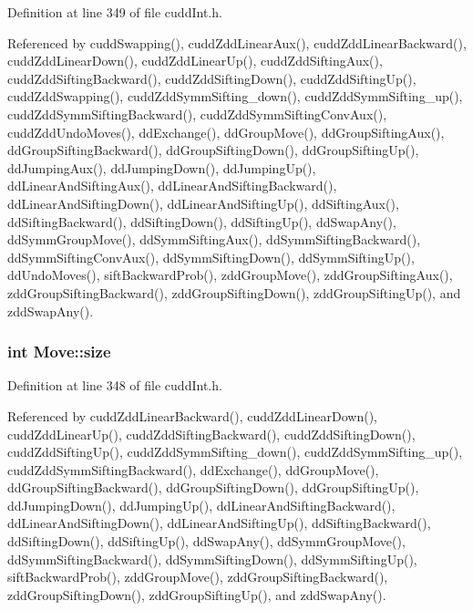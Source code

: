 Definition at line 349 of file cudd\-Int.h.

Referenced by cudd\-Swapping(), cudd\-Zdd\-Linear\-Aux(), cudd\-Zdd\-Linear\-Backward(), cudd\-Zdd\-Linear\-Down(), cudd\-Zdd\-Linear\-Up(), cudd\-Zdd\-Sifting\-Aux(), cudd\-Zdd\-Sifting\-Backward(), cudd\-Zdd\-Sifting\-Down(), cudd\-Zdd\-Sifting\-Up(), cudd\-Zdd\-Swapping(), cudd\-Zdd\-Symm\-Sifting\_\-down(), cudd\-Zdd\-Symm\-Sifting\_\-up(), cudd\-Zdd\-Symm\-Sifting\-Backward(), cudd\-Zdd\-Symm\-Sifting\-Conv\-Aux(), cudd\-Zdd\-Undo\-Moves(), dd\-Exchange(), dd\-Group\-Move(), dd\-Group\-Sifting\-Aux(), dd\-Group\-Sifting\-Backward(), dd\-Group\-Sifting\-Down(), dd\-Group\-Sifting\-Up(), dd\-Jumping\-Aux(), dd\-Jumping\-Down(), dd\-Jumping\-Up(), dd\-Linear\-And\-Sifting\-Aux(), dd\-Linear\-And\-Sifting\-Backward(), dd\-Linear\-And\-Sifting\-Down(), dd\-Linear\-And\-Sifting\-Up(), dd\-Sifting\-Aux(), dd\-Sifting\-Backward(), dd\-Sifting\-Down(), dd\-Sifting\-Up(), dd\-Swap\-Any(), dd\-Symm\-Group\-Move(), dd\-Symm\-Sifting\-Aux(), dd\-Symm\-Sifting\-Backward(), dd\-Symm\-Sifting\-Conv\-Aux(), dd\-Symm\-Sifting\-Down(), dd\-Symm\-Sifting\-Up(), dd\-Undo\-Moves(), sift\-Backward\-Prob(), zdd\-Group\-Move(), zdd\-Group\-Sifting\-Aux(), zdd\-Group\-Sifting\-Backward(), zdd\-Group\-Sifting\-Down(), zdd\-Group\-Sifting\-Up(), and zdd\-Swap\-Any().
\subsubsection{\setlength{\rightskip}{0pt plus 5cm}int \bf{Move::size}}\label{structMove_4841f4b30702d4d64d4bf1abc85a47b5}




Definition at line 348 of file cudd\-Int.h.

Referenced by cudd\-Zdd\-Linear\-Backward(), cudd\-Zdd\-Linear\-Down(), cudd\-Zdd\-Linear\-Up(), cudd\-Zdd\-Sifting\-Backward(), cudd\-Zdd\-Sifting\-Down(), cudd\-Zdd\-Sifting\-Up(), cudd\-Zdd\-Symm\-Sifting\_\-down(), cudd\-Zdd\-Symm\-Sifting\_\-up(), cudd\-Zdd\-Symm\-Sifting\-Backward(), dd\-Exchange(), dd\-Group\-Move(), dd\-Group\-Sifting\-Backward(), dd\-Group\-Sifting\-Down(), dd\-Group\-Sifting\-Up(), dd\-Jumping\-Down(), dd\-Jumping\-Up(), dd\-Linear\-And\-Sifting\-Backward(), dd\-Linear\-And\-Sifting\-Down(), dd\-Linear\-And\-Sifting\-Up(), dd\-Sifting\-Backward(), dd\-Sifting\-Down(), dd\-Sifting\-Up(), dd\-Swap\-Any(), dd\-Symm\-Group\-Move(), dd\-Symm\-Sifting\-Backward(), dd\-Symm\-Sifting\-Down(), dd\-Symm\-Sifting\-Up(), sift\-Backward\-Prob(), zdd\-Group\-Move(), zdd\-Group\-Sifting\-Backward(), zdd\-Group\-Sifting\-Down(), zdd\-Group\-Sifting\-Up(), and zdd\-Swap\-Any().
